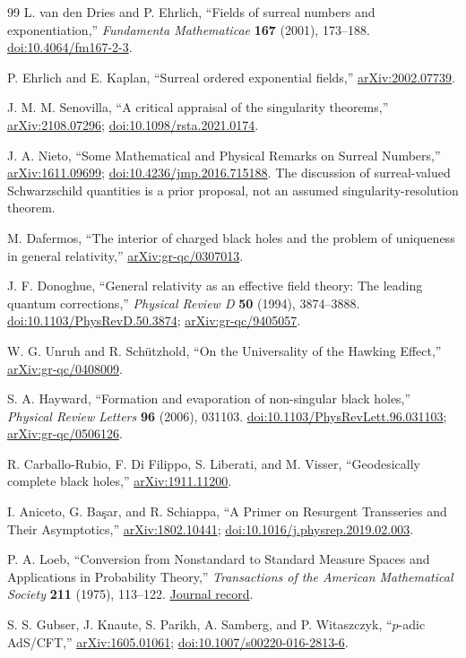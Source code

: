 \documentclass[11pt,a4paper]{article}
\numberwithin{equation}{section}
\theoremstyle{definition}
\theoremstyle{remark}
\newcommand{\arxiv}[1]{\href{https://arxiv.org/abs/#1}{arXiv:#1}}
\newcommand{\doi}[1]{\href{https://doi.org/#1}{doi:#1}}
\begin{document}
\begin{thebibliography}{99}
L. van den Dries and P. Ehrlich,
``Fields of surreal numbers and exponentiation,''
\emph{Fundamenta Mathematicae} \textbf{167} (2001), 173--188.
\doi{10.4064/fm167-2-3}.

P. Ehrlich and E. Kaplan,
``Surreal ordered exponential fields,''
\arxiv{2002.07739}.

J. M. M. Senovilla,
``A critical appraisal of the singularity theorems,''
\arxiv{2108.07296}; \doi{10.1098/rsta.2021.0174}.

J. A. Nieto,
``Some Mathematical and Physical Remarks on Surreal Numbers,''
\arxiv{1611.09699}; \doi{10.4236/jmp.2016.715188}.
The discussion of surreal-valued Schwarzschild quantities is a prior proposal, not an assumed singularity-resolution theorem.

M. Dafermos,
``The interior of charged black holes and the problem of uniqueness in general relativity,''
\arxiv{gr-qc/0307013}.

J. F. Donoghue,
``General relativity as an effective field theory: The leading quantum corrections,''
\emph{Physical Review D} \textbf{50} (1994), 3874--3888.
\doi{10.1103/PhysRevD.50.3874}; \arxiv{gr-qc/9405057}.

W. G. Unruh and R. Sch\"utzhold,
``On the Universality of the Hawking Effect,''
\arxiv{gr-qc/0408009}.

S. A. Hayward,
``Formation and evaporation of non-singular black holes,''
\emph{Physical Review Letters} \textbf{96} (2006), 031103.
\doi{10.1103/PhysRevLett.96.031103}; \arxiv{gr-qc/0506126}.

R. Carballo-Rubio, F. Di Filippo, S. Liberati, and M. Visser,
``Geodesically complete black holes,''
\arxiv{1911.11200}.

I. Aniceto, G. Ba\c{s}ar, and R. Schiappa,
``A Primer on Resurgent Transseries and Their Asymptotics,''
\arxiv{1802.10441}; \doi{10.1016/j.physrep.2019.02.003}.

P. A. Loeb,
``Conversion from Nonstandard to Standard Measure Spaces and Applications in Probability Theory,''
\emph{Transactions of the American Mathematical Society} \textbf{211} (1975), 113--122.
\href{https://www.jstor.org/stable/1997222}{Journal record}.

S. S. Gubser, J. Knaute, S. Parikh, A. Samberg, and P. Witaszczyk,
``$p$-adic AdS/CFT,''
\arxiv{1605.01061}; \doi{10.1007/s00220-016-2813-6}.

\end{thebibliography}
\end{document}

